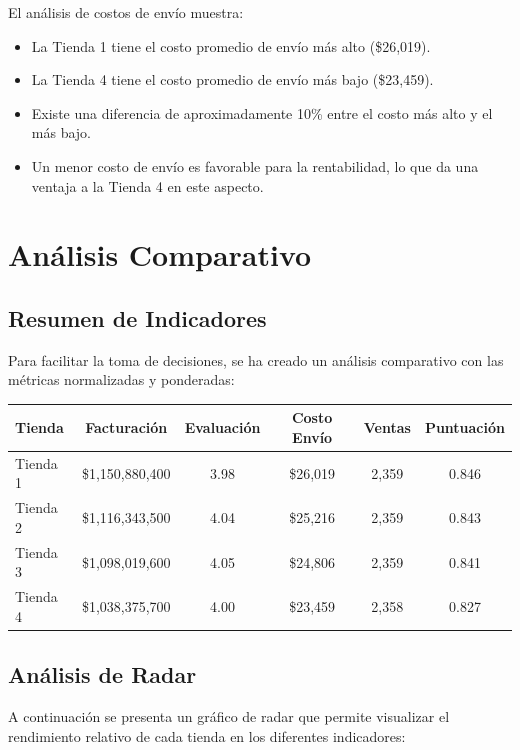 \documentclass[12pt,a4paper]{report}\usepackage[spanish]{babel}\usepackage[utf8]{inputenc}\usepackage{graphicx}\usepackage{geometry}\usepackage{xcolor}\usepackage{tikz}\usepackage{pgfplots}\usepackage{booktabs}\usepackage{multicol}\usepackage{hyperref}\usepackage{pgf-pie}
\begin{document}
El análisis de costos de envío muestra:

\begin{itemize}
    \item La Tienda 1 tiene el costo promedio de envío más alto (\$26,019).
    \item La Tienda 4 tiene el costo promedio de envío más bajo (\$23,459).
    \item Existe una diferencia de aproximadamente 10\% entre el costo más alto y el más bajo.
    \item Un menor costo de envío es favorable para la rentabilidad, lo que da una ventaja a la Tienda 4 en este aspecto.
\end{itemize}

\chapter{Análisis Comparativo}

\section{Resumen de Indicadores}

Para facilitar la toma de decisiones, se ha creado un análisis comparativo con las métricas normalizadas y ponderadas:

\begin{center}
\begin{tabular}{lccccc}
\toprule
\textbf{Tienda} & \textbf{Facturación} & \textbf{Evaluación} & \textbf{Costo Envío} & \textbf{Ventas} & \textbf{Puntuación} \\
\midrule
Tienda 1 & \$1,150,880,400 & 3.98 & \$26,019 & 2,359 & 0.846 \\
Tienda 2 & \$1,116,343,500 & 4.04 & \$25,216 & 2,359 & 0.843 \\
Tienda 3 & \$1,098,019,600 & 4.05 & \$24,806 & 2,359 & 0.841 \\
Tienda 4 & \$1,038,375,700 & 4.00 & \$23,459 & 2,358 & 0.827 \\
\bottomrule
\end{tabular}
\end{center}

\section{Análisis de Radar}

A continuación se presenta un gráfico de radar que permite visualizar el rendimiento relativo de cada tienda en los diferentes indicadores:
\end{document}
